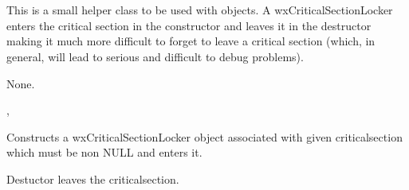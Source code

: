 \section{}\label{wxcriticalsectionlocker}

This is a small helper class to be used with  
objects. A wxCriticalSectionLocker enters the critical section in the
constructor and leaves it in the destructor making it much more difficult to
forget to leave a critical section (which, in general, will lead to serious
and difficult to debug problems).


None.


, 


\label{wxcriticalsectionlockerctor}


Constructs a wxCriticalSectionLocker object associated with given
criticalsection which must be non NULL and enters it.

\label{wxcriticalsectionlockerdtor}


Destuctor leaves the criticalsection.

